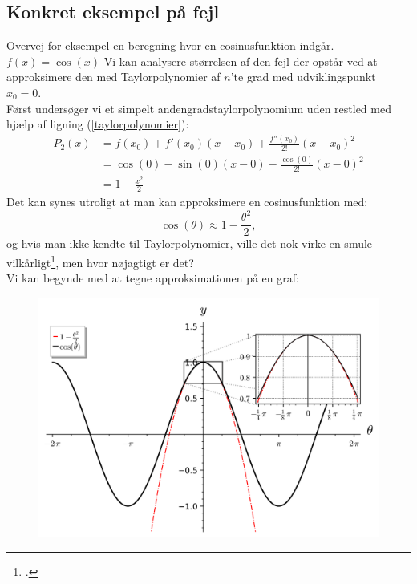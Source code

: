 \documentclass[12pt, a4paper]{article}
\begin{document}
\begin{refsection}
\subsection{Konkret eksempel på fejl} %
Overvej for eksempel en beregning hvor en cosinusfunktion indgår. $f(x)=\cos(x)$ Vi kan analysere størrelsen af den fejl der opstår ved at approksimere den med Taylorpolynomier af $n$'te grad med udviklingspunkt $x_0=0$.\\
Først undersøger vi et simpelt andengradstaylorpolynomium uden restled med hjælp af ligning (\ref{taylorpolynomier}):\\
 \begin{equation*}
    \begin{aligned}
        P_2(x)&=f(x_0)+f'(x_0)(x-x_0)+\frac{f''(x_0)}{2!}(x-x_0)^2\\
        &=\cos(0)-\sin(0)(x-0)-\frac{\cos(0)}{2!}(x-0)^2\\
        &=1-\frac{x^2}{2}
    \end{aligned}
\end{equation*}
Det kan synes utroligt at man kan approksimere en cosinusfunktion med:
\begin{equation*}\label{cosiunsanden}
    \cos(\theta)\approx 1-\frac{\theta^2}{2},
\end{equation*}
og hvis man ikke kendte til Taylorpolynomier, ville det nok virke en smule vilkårligt\footcite{3blue1browntaylor}, men hvor nøjagtigt er det?\\
Vi kan begynde med at tegne approksimationen på en graf:
\begin{figure}[h]
     \includegraphics[width=\textwidth]{figures/cosinuszoom.png}

\end{figure}
\end{refsection}
\end{document}

